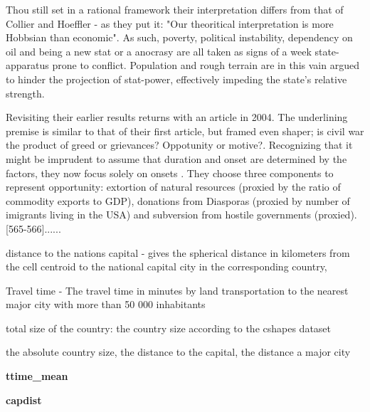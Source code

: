 
Thou still set in a rational framework their interpretation differs from that of Collier and Hoeffler - as they put it: "Our theoritical interpretation is more Hobbsian than economic"\citep[76]{Fearon_Laitin_2003}. As such, poverty, political instability, dependency on oil and being a new stat or a anocrasy are all taken as signs of a week state-apparatus prone to conflict. Population and rough terrain are in this vain argued to hinder the projection of stat-power, effectively impeding the state's relative strength\citep[75-77]{Fearon_Laitin_2003}.

Revisiting their earlier results \cite{Collier_Hoeffler_2004} returns with an article in 2004. The underlining premise is similar to that of their first article, but framed even shaper; is civil war the product of greed or grievances? Oppotunity or motive?\citep[563]{Collier_Hoeffler_2004}. Recognizing that it might be imprudent to assume that duration and onset are determined by the factors, they now focus solely on onsets \citep[563]{Collier_Hoeffler_2004}. They choose three components to represent opportunity: extortion of natural resources (proxied by the ratio of commodity exports to GDP), donations from Diasporas (proxied by number of imigrants living in the USA) and subversion from hostile governments (proxied). [565-566]...... 






distance to the nations capital - gives the spherical distance in kilometers from the cell centroid to the national capital
city in the corresponding country,

Travel time - The travel time in minutes by land transportation to the nearest major city with more than 50 000 inhabitants


total size of the country: the country size according to the cshapes dataset \citep{Weidmann_2010} 


the absolute country size, the distance to the capital, the distance a major city

\textbf{ttime\_mean} 

\textbf{capdist}


